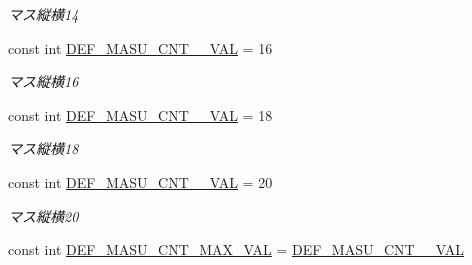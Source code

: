 \begin{DoxyCompactItemize}
\begin{DoxyCompactList}\small\item\em マス縦横14 \end{DoxyCompactList}\item 
const int \hyperlink{class_reversi4color_wpf_1_1_reversi_const_accf7fe31f941c364ca24ae6bf0a8dcfb}{D\+E\+F\+\_\+\+M\+A\+S\+U\+\_\+\+C\+N\+T\+\_\+\_\+\+V\+AL} = 16\hypertarget{class_reversi4color_wpf_1_1_reversi_const_accf7fe31f941c364ca24ae6bf0a8dcfb}{}\label{class_reversi4color_wpf_1_1_reversi_const_accf7fe31f941c364ca24ae6bf0a8dcfb}

\begin{DoxyCompactList}\small\item\em マス縦横16 \end{DoxyCompactList}\item 
const int \hyperlink{class_reversi4color_wpf_1_1_reversi_const_a3e01551ae73f6ae2b9d647e47f2e5901}{D\+E\+F\+\_\+\+M\+A\+S\+U\+\_\+\+C\+N\+T\+\_\+\_\+\+V\+AL} = 18\hypertarget{class_reversi4color_wpf_1_1_reversi_const_a3e01551ae73f6ae2b9d647e47f2e5901}{}\label{class_reversi4color_wpf_1_1_reversi_const_a3e01551ae73f6ae2b9d647e47f2e5901}

\begin{DoxyCompactList}\small\item\em マス縦横18 \end{DoxyCompactList}\item 
const int \hyperlink{class_reversi4color_wpf_1_1_reversi_const_aac22105871e76938d8ba055fabd03035}{D\+E\+F\+\_\+\+M\+A\+S\+U\+\_\+\+C\+N\+T\+\_\+\_\+\+V\+AL} = 20\hypertarget{class_reversi4color_wpf_1_1_reversi_const_aac22105871e76938d8ba055fabd03035}{}\label{class_reversi4color_wpf_1_1_reversi_const_aac22105871e76938d8ba055fabd03035}

\begin{DoxyCompactList}\small\item\em マス縦横20 \end{DoxyCompactList}\item 
const int \hyperlink{class_reversi4color_wpf_1_1_reversi_const_ac2443a1b533b0750c0a7c40ab612905a}{D\+E\+F\+\_\+\+M\+A\+S\+U\+\_\+\+C\+N\+T\+\_\+\+M\+A\+X\+\_\+\+V\+AL} = \hyperlink{class_reversi4color_wpf_1_1_reversi_const_aac22105871e76938d8ba055fabd03035}{D\+E\+F\+\_\+\+M\+A\+S\+U\+\_\+\+C\+N\+T\+\_\+\_\+\+V\+AL}\hypertarget{class_reversi4color_wpf_1_1_reversi_const_ac2443a1b533b0750c0a7c40ab612905a}{}\label{class_reversi4color_wpf_1_1_reversi_const_ac2443a1b533b0750c0a7c40ab612905a}


\end{DoxyCompactItemize}
